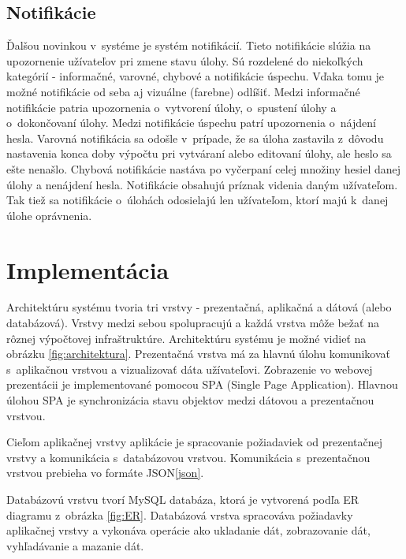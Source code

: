 \documentclass[slovak]{fitthesis}
\begin{document}
\section{Notifikácie}
Ďalšou novinkou v~systéme je systém notifikácií. Tieto notifikácie slúžia na upozornenie užívateľov pri zmene stavu úlohy. Sú rozdelené do niekoľkých kategórií - informačné, varovné, chybové a notifikácie úspechu. Vďaka tomu je možné notifikácie od seba aj vizuálne (farebne) odlíšiť. Medzi informačné notifikácie patria upozornenia o~vytvorení úlohy, o~spustení úlohy a o~dokončovaní úlohy. Medzi notifikácie úspechu patrí upozornenia o~nájdení hesla. Varovná notifikácia sa odošle v~prípade, že sa úloha zastavila z~dôvodu nastavenia konca doby výpočtu pri vytváraní alebo editovaní úlohy, ale heslo sa ešte nenašlo. Chybová notifikácie nastáva po vyčerpaní celej množiny hesiel danej úlohy a nenájdení hesla. Notifikácie obsahujú príznak videnia daným užívateľom. Tak tiež sa notifikácie o~úlohách odosielajú len užívateľom, ktorí majú k~danej úlohe oprávnenia.





\chapter{Implementácia}\label{implementacia}
Architektúru systému tvoria tri vrstvy - prezentačná, aplikačná a dátová (alebo databázová). Vrstvy medzi sebou spolupracujú a každá vrstva môže bežať na rôznej výpočtovej infraštruktúre. Architektúru systému je možné vidieť na obrázku \ref{fig:architektura}.
Prezentačná vrstva má za hlavnú úlohu komunikovať s~aplikačnou vrstvou a vizualizovať dáta užívateľovi. Zobrazenie vo webovej prezentácii je implementované pomocou SPA (Single Page Application). Hlavnou úlohou SPA je synchronizácia stavu objektov medzi dátovou a prezentačnou vrstvou. 

Cieľom aplikačnej vrstvy aplikácie je spracovanie požiadaviek od prezentačnej vrstvy a komunikácia s~databázovou vrstvou. Komunikácia s~prezentačnou vrstvou prebieha vo formáte JSON\ref{json}.

Databázovú vrstvu tvorí MySQL databáza, ktorá je vytvorená podľa ER diagramu z~obrázka \ref{fig:ER}. Databázová vrstva spracováva požiadavky aplikačnej vrstvy a vykonáva operácie ako ukladanie dát, zobrazovanie dát, vyhľadávanie a mazanie dát.
\end{document}
